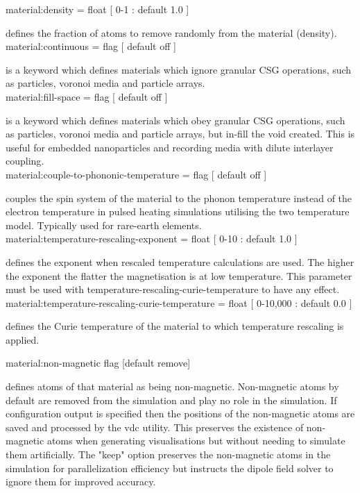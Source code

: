 {\zicf material:density = float [ 0-1 : default 1.0 ]} defines the fraction of atoms to remove randomly from the material (density).\\

{\zicf material:continuous = flag [ default off ]} is a keyword which defines materials which ignore granular CSG operations, such as particles, voronoi media and particle arrays.\\

{\zicf material:fill-space = flag [ default off ]} is a keyword which defines materials which obey granular CSG operations, such as particles, voronoi media and particle arrays, but in-fill the void created. This is useful for embedded nanoparticles and recording media with dilute interlayer coupling.\\

{\zicf material:couple-to-phononic-temperature = flag [ default off ]} couples the spin system of the material to the phonon temperature instead of the electron temperature in pulsed heating simulations utilising the two temperature model. Typically used for rare-earth elements.\\

{\zicf material:temperature-rescaling-exponent = float [ 0-10 : default 1.0 ]} defines the exponent when rescaled temperature calculations are used. The higher the exponent the flatter the magnetisation is at low temperature. This parameter must be used with temperature-rescaling-curie-temperature to have any effect.\\

{\zicf material:temperature-rescaling-curie-temperature = float [ 0-10,000 : default 0.0 ]} defines the Curie temperature of the material to which temperature rescaling is applied.

{\zicf material:non-magnetic flag [default remove]}
 defines atoms of
that material as being non-magnetic. Non-magnetic atoms by default are removed
from the simulation and play no role in the simulation. If configuration
output is specified then the positions of the non-magnetic atoms are saved and
processed by the vdc utility. This preserves the existence of non-magnetic
atoms when generating visualisations but without needing to simulate them
artificially. The "keep" option preserves the non-magnetic atoms in the
simulation for parallelization efficiency but instructs the dipole field solver
to ignore them for improved accuracy.\\

